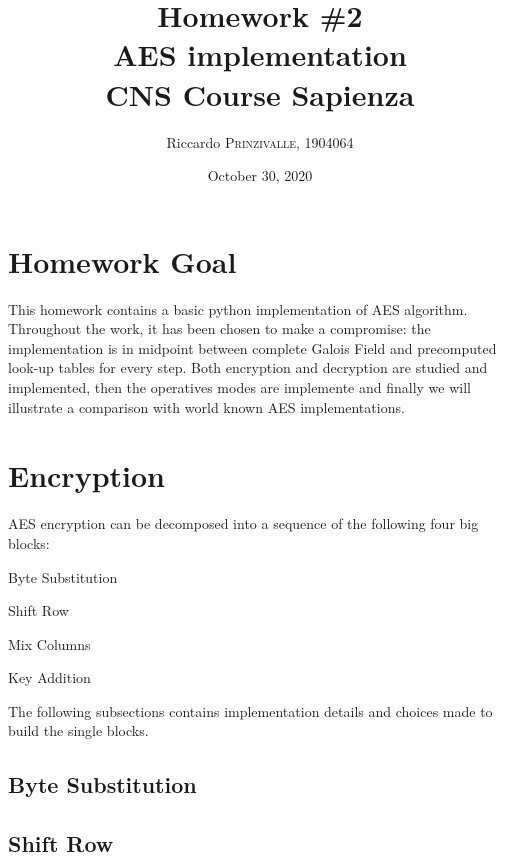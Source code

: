 \documentclass{article}
\title{Homework \#2 \\AES implementation \\[0.2em]\small{}CNS Course Sapienza} %
\author{Riccardo \textsc{Prinzivalle}, 1904064} %
\date{October 30, 2020} %
\begin{document}
\maketitle %


\section{Homework Goal}

This homework contains a basic python implementation of AES algorithm. Throughout the work, it has been chosen to make a compromise: the implementation is in midpoint between complete Galois Field and precomputed look-up tables for every step. Both encryption and decryption are studied and implemented, then the operatives modes are implemente and finally we will illustrate a comparison with world known AES implementations.

\section{Encryption}
AES encryption can be decomposed into a sequence of the following four big blocks:  

\begin{enumerate}
\begin{item}
Byte Substitution
\end{item}
\begin{item}
Shift Row 
\end{item}
\begin{item}
Mix Columns
\end{item}
\begin{item}
Key Addition 
\end{item}
\end{enumerate}

The following subsections contains implementation details and choices made to build the single blocks.

\subsection{Byte Substitution}

\subsection{Shift Row }
\end{document}
